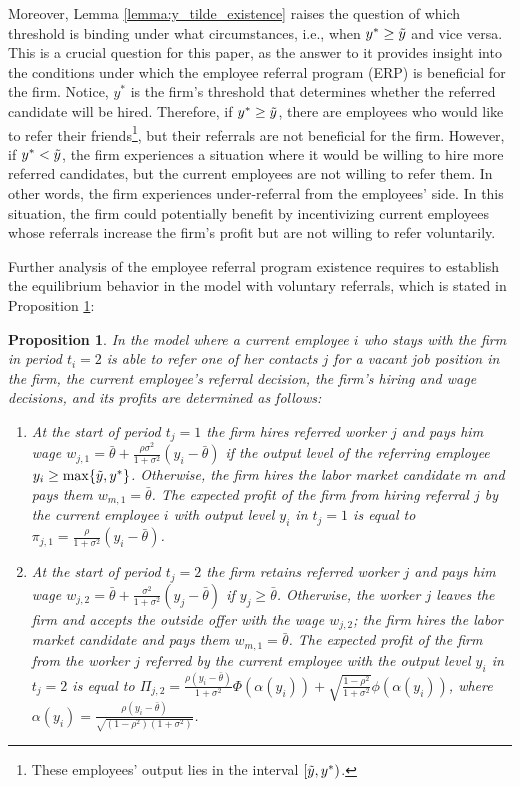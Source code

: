 \documentclass[12pt]{article}
\newtheorem{proposition}{Proposition}
\begin{document}
Moreover, Lemma \ref{lemma:y_tilde_existence} raises the question of which threshold is binding under what circumstances, i.e., when $y^* \geq \Tilde{y}$ and vice versa. This is a crucial question for this paper, as the answer to it provides insight into the conditions under which the employee referral program (ERP) is beneficial for the firm. Notice, $y^*$ is the firm's threshold that determines whether the referred candidate will be hired. Therefore, if $y^* \geq \Tilde{y}$, there are employees who would like to refer their friends\footnote{These employees' output lies in the interval $[\Tilde{y}, y^*)$.}, but their referrals are not beneficial for the firm. However, if $y^* < \Tilde{y}$, the firm experiences a situation where it would be willing to hire more referred candidates, but the current employees are not willing to refer them. In other words, the firm experiences under-referral from the employees' side. In this situation, the firm could potentially benefit by incentivizing current employees whose referrals increase the firm's profit but are not willing to refer voluntarily.

Further analysis of the employee referral program existence requires to establish the equilibrium behavior in the model with voluntary referrals, which is stated in Proposition \ref{prop:eq_vr}:
\begin{proposition}\label{prop:eq_vr}
    In the model where a current employee $i$ who stays with the firm in period $t_i = 2$ is able to refer one of her contacts $j$ for a vacant job position in the firm, the current employee's referral decision, the firm’s hiring and wage decisions, and its profits are determined as follows:
    \begin{enumerate}[label={\roman*})]
		\item At the start of period $t_j = 1$ the firm hires referred worker $j$ and pays him wage $w_{j,1} = \bar{\theta}+\frac{\rho \sigma^2}{1+\sigma^2} \left(y_i - \bar{\theta}\right)$ if the output level of the referring employee $y_i \geq \max \{ \Tilde{y}, y^* \}$. Otherwise, the firm hires the labor market candidate $m$ and pays them $w_{m,1} = \bar{\theta}$. The expected profit of the firm from hiring referral $j$ by the current employee $i$ with output level $y_i$ in $t_j = 1$ is equal to $\pi_{j,1} = \frac{\rho}{1+\sigma^2}\left(y_i - \bar{\theta}\right)$.
        \item At the start of period $t_j = 2$ the firm retains referred worker $j$ and pays him wage $w_{j,2} = \bar{\theta} + \frac{\sigma^2}{1+\sigma^2}\left( y_j - \bar{\theta} \right)$ if $y_j \geq \bar{\theta}$. Otherwise, the worker $j$ leaves the firm and accepts the outside offer with the wage $w_{j,2}$; the firm hires the labor market candidate and pays them $w_{m,1} = \bar{\theta}$. The expected profit of the firm from the worker $j$ referred by the current employee with the output level $y_i$ in $t_j = 2$ is equal to $\Pi_{j,2} = \frac{\rho\left(y_i-\bar{\theta}\right)}{1 + \sigma^2}\Phi(\alpha(y_i))
        +\sqrt{\frac{1-\rho^2}{1+\sigma^2}}\phi(\alpha(y_i))$, where $\alpha (y_i) = \frac{\rho\left(y_i - \bar{\theta}\right)}{\sqrt{(1-\rho^2)(1+\sigma^2)}}$.
	\end{enumerate}
\end{proposition}
\end{document}
